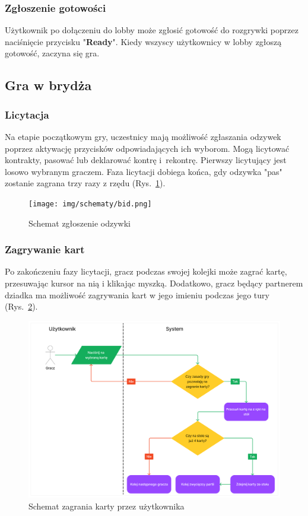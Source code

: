 \FloatBarrier

\subsubsection{Zgłoszenie gotowości}
Użytkownik po dołączeniu do lobby może zgłosić gotowość do rozgrywki poprzez 
naciśnięcie przycisku "\textbf{Ready}". Kiedy wszyscy użytkownicy w lobby zgłoszą
gotowość, zaczyna się gra.

\subsection{Gra w brydża}

\subsubsection{Licytacja}
Na etapie początkowym gry, uczestnicy mają możliwość zgłaszania odzywek poprzez 
aktywację przycisków odpowiadających ich wyborom. Mogą licytować kontrakty, pasować lub
deklarować kontrę i~rekontrę. Pierwszy licytujący jest losowo 
wybranym graczem. Faza licytacji dobiega końca, gdy odzywka "pas" zostanie zagrana 
trzy razy z rzędu (Rys.~\ref{fig:schemat_bid}).

\begin{figure}[h]
  \centering
  \texttt{[image: img/schematy/bid.png]}
  \caption{Schemat zgłoszenie odzywki}
  \label{fig:schemat_bid}
\end{figure}

\FloatBarrier

\subsubsection{Zagrywanie kart}

Po zakończeniu fazy licytacji, gracz podczas swojej kolejki może zagrać kartę, 
przesuwając kursor na nią i klikając myszką. Dodatkowo, gracz będący partnerem dziadka 
ma możliwość zagrywania kart w jego imieniu podczas jego tury (Rys.~\ref{fig:schemat_play_card}).


\begin{figure}[h]
  \centering
  \includegraphics[width=\textwidth]{img/schematy/play_card.png}
  \caption{Schemat zagrania karty przez użytkownika}
  \label{fig:schemat_play_card}
\end{figure}

